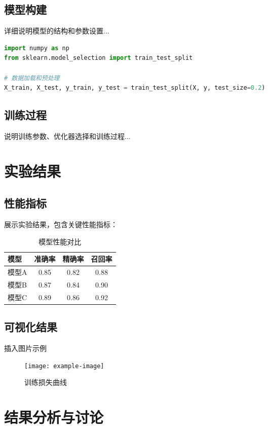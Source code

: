 \documentclass[a4paper,11pt]{article}
\begin{document}
\subsection{模型构建}
详细说明模型的结构和参数设置...

\begin{lstlisting}[language=Python, caption=示例代码]
import numpy as np
from sklearn.model_selection import train_test_split

# 数据加载和预处理
X_train, X_test, y_train, y_test = train_test_split(X, y, test_size=0.2)
\end{lstlisting}

\subsection{训练过程}
说明训练参数、优化器选择和训练过程...

\section{实验结果}
\subsection{性能指标}
展示实验结果，包含关键性能指标：

\begin{table}[h]
    \centering
    \caption{模型性能对比}
    \begin{tabular}{lccc}
        \toprule
        模型 & 准确率 & 精确率 & 召回率 \\
        \midrule
        模型A & 0.85 & 0.82 & 0.88 \\
        模型B & 0.87 & 0.84 & 0.90 \\
        模型C & 0.89 & 0.86 & 0.92 \\
        \bottomrule
    \end{tabular}
\end{table}

\subsection{可视化结果}
插入图片示例
\begin{figure}[h]
    \centering
    \texttt{[image: example-image]}
    \caption{训练损失曲线}
    \label{fig:loss}
\end{figure}

\section{结果分析与讨论}
\end{document}

